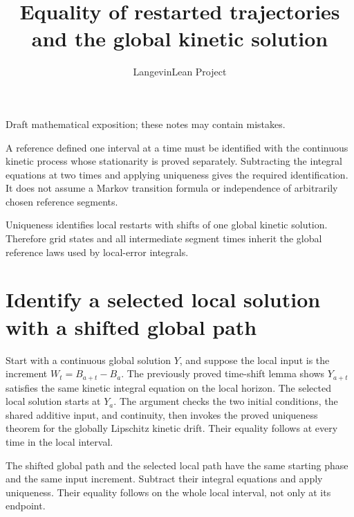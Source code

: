 \documentclass[11pt,a4paper]{article}
\title{\texorpdfstring{Equality of restarted trajectories and the global kinetic solution}{Equality of restarted trajectories and the global kinetic solution}}
\author{LangevinLean Project}
\date{}
\begin{document}
\maketitle
Draft mathematical exposition; these notes may contain mistakes.


A reference defined one interval at a time must be identified with the continuous kinetic process whose stationarity is proved separately. Subtracting the integral equations at two times and applying uniqueness gives the required identification. It does not assume a Markov transition formula or independence of arbitrarily chosen reference segments.



Uniqueness identifies local restarts with shifts of one global kinetic solution. Therefore grid states and all intermediate segment times inherit the global reference laws used by local-error integrals.


\section{\texorpdfstring{Identify a selected local solution with a shifted global path}{Identify a selected local solution with a shifted global path}}


Start with a continuous global solution \(Y\), and suppose the local input is the increment \(W_t=B_{a+t}-B_a\). The previously proved time-shift lemma shows \(Y_{a+t}\) satisfies the same kinetic integral equation on the local horizon. The selected local solution starts at \(Y_a\). The argument checks the two initial conditions, the shared additive input, and continuity, then invokes the proved uniqueness theorem for the globally Lipschitz kinetic drift. Their equality follows at every time in the local interval.



The shifted global path and the selected local path have the same starting phase and the same input increment. Subtract their integral equations and apply uniqueness. Their equality follows on the whole local interval, not only at its endpoint.
\end{document}
